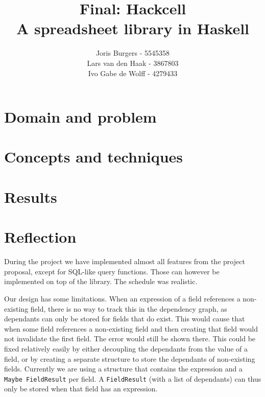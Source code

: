 \documentclass{article}
\title{
	Final: Hackcell \\
	\vskip 0.5cm
	\large{A spreadsheet library in Haskell}
}
\author{Joris Burgers - 5545358\\ Lars van den Haak - 3867803\\ Ivo Gabe de Wolff - 4279433}
\begin{document}
	\maketitle
	
	\section{Domain and problem}
	
	\section{Concepts and techniques}
	
	\section{Results}
	
	\section{Reflection}
	During the project we have implemented almost all features from the project proposal, except for SQL-like query functions. Those can however be implemented on top of the library. The schedule was realistic.
	
	Our design has some limitations. When an expression of a field references a non-existing field, there is no way to track this in the dependency graph, as dependants can only be stored for fields that do exist. This would cause that when some field references a non-existing field and then creating that field would not invalidate the first field. The error would still be shown there. This could be fixed relatively easily by either decoupling the dependants from the value of a field, or by creating a separate structure to store the dependants of non-existing fields. Currently we are using a structure that contains the expression and a \texttt{Maybe FieldResult} per field. A \texttt{FieldResult} (with a list of dependants) can thus only be stored when that field has an expression.
	
\end{document}
